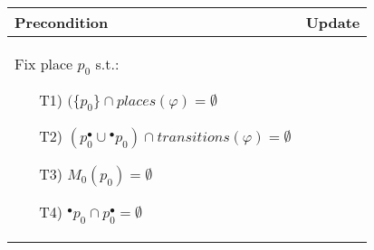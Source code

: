 \begin{figure}[h!]
\begin{tikzpicture}
    \end{tikzpicture}
    \vspace{5mm}
    \begin{adjustbox}{center}
        \begin{tabular}{|p{70mm}|p{70mm}|} \hline
        Precondition & Update \\ \hline
        Fix place $p_0$ s.t.:
        \begin{itemize}[leftmargin=9mm]
            \item[T1)] $(\{p_0\} \cap places(\varphi) = \emptyset$
            \item[T2)] $(p_0^\bullet \cup {}^\bullet p_0) \cap transitions(\varphi) = \emptyset$
            \item[T3)] $M_0(p_0)=\emptyset$
            \item[T4)] $^\bullet p_0 \cap p_0^\bullet = \emptyset$


\end{itemize}
\end{tabular}
\end{adjustbox}
\end{figure}

